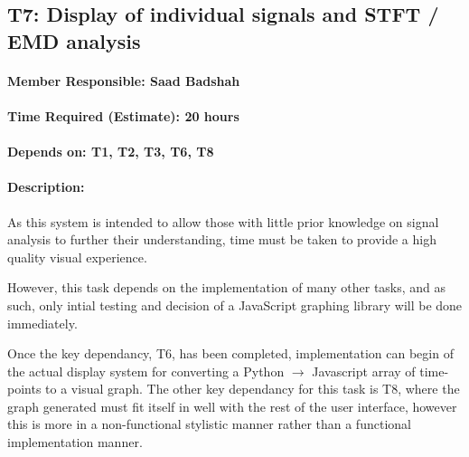 \documentclass[
  english,
  paper=a4,
  oneside  ,captions=tableheading
]{scrbook}
\begin{document}
\newpage
\hypertarget{t7-display-of-individual-signals-and-stft-emd-analysis}{%
\subsection{T7: Display of individual signals and STFT / EMD
analysis}\label{t7-display-of-individual-signals-and-stft-emd-analysis}}

\hypertarget{member-responsible-saad-badshah}{%
\paragraph{Member Responsible: Saad
Badshah}\label{member-responsible-saad-badshah}}

\hypertarget{time-required-estimate-20-hours-2}{%
\paragraph{Time Required (Estimate): 20
hours}\label{time-required-estimate-20-hours-2}}

\hypertarget{depends-on-t1-t2-t3-t6-t8}{%
\paragraph{Depends on: T1, T2, T3, T6,
T8}\label{depends-on-t1-t2-t3-t6-t8}}

\hypertarget{description-5}{%
\paragraph{Description:}\label{description-5}}

As this system is intended to allow those with little prior knowledge on
signal analysis to further their understanding, time must be taken to
provide a high quality visual experience.

However, this task depends on the implementation of many other tasks,
and as such, only intial testing and decision of a JavaScript graphing
library will be done immediately.

Once the key dependancy, T6, has been completed, implementation can
begin of the actual display system for converting a
Python $\rightarrow$ Javascript array of time-points to a visual graph.
The other key dependancy for this task is T8, where the graph generated
must fit itself in well with the rest of the user interface, however
this is more in a non-functional stylistic manner rather than a
functional implementation manner.
\end{document}
